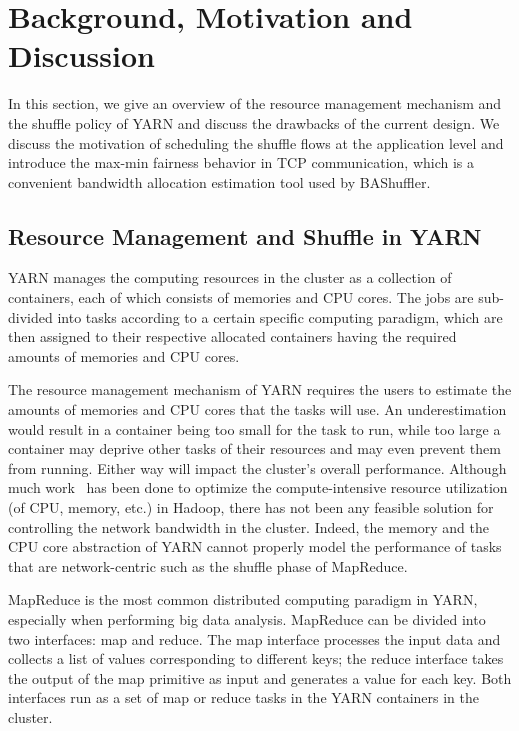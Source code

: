 \documentclass[10pt,journal,compsoc]{IEEEtran}
\begin{document}
\section{Background, Motivation and Discussion}\label{section:background}
In this section, we give an overview of the resource management mechanism
and the shuffle policy of YARN and discuss the drawbacks of the current design. 
We discuss the motivation of scheduling the shuffle flows at the application level
and introduce the max-min fairness behavior in TCP communication, which is
a convenient bandwidth allocation estimation tool used by BAShuffler. 

\subsection{Resource Management and Shuffle in YARN}

YARN manages the computing resources in the cluster as a collection
of containers, each of which consists of memories and CPU cores. The
jobs are sub-divided into tasks according to a certain specific
computing paradigm, which are then assigned to their respective allocated
containers
having the required amounts of memories and CPU cores.

 
The resource management mechanism of YARN requires the users to
estimate the amounts of memories and CPU cores that the tasks will use.
An underestimation would result in a container being too small for the task
to run, while too large a container may deprive other tasks of their
resources and may even prevent them from running. Either way
will impact the cluster's overall performance. 
Although much work~\cite{Delimitrou:2014:QRQ, smapreduce} has been done to optimize the compute-intensive
resource utilization (of CPU, memory, etc.) in
Hadoop, there has not been any
feasible solution for controlling the network bandwidth in the
cluster.
Indeed,
the memory and the CPU core abstraction of YARN cannot properly model the
performance of tasks that are network-centric such as
the shuffle phase of MapReduce. 
 
MapReduce is the most common distributed computing paradigm in YARN,
especially when performing big data analysis. MapReduce can be divided
into two interfaces: map and reduce.
The map interface processes the input data and collects a list of
values corresponding to different keys;
the reduce interface takes the output of the map primitive as
input and generates a value for each key.
Both interfaces run as a set of map or reduce tasks in the YARN
containers in the cluster.
\end{document}
